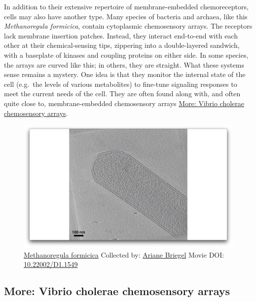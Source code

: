 \documentclass[]{tufte-book}
\begin{document}
In addition to their extensive repertoire of membrane-embedded
chemoreceptors, cells may also have another type. Many species of
bacteria and archaea, like this \emph{Methanoregula formicica}, contain
cytoplasmic chemosensory arrays. The receptors lack membrane insertion
patches. Instead, they interact end-to-end with each other at their
chemical-sensing tips, zippering into a double-layered sandwich, with a
baseplate of kinases and coupling proteins on either side. In some
species, the arrays are curved like this; in others, they are straight.
What these systems sense remains a mystery. One idea is that they
monitor the internal state of the cell (e.g.~the levels of various
metabolites) to fine-tune signaling responses to meet the current needs
of the cell. They are often found along with, and often quite close to,
membrane-embedded chemosensory arrays
\protect\hyperlink{Vibrio_cholerae_chemosensory_arrays}{More: Vibrio
cholerae chemosensory arrays}.





\begin{figure}
\includegraphics{movie_stills/7_5} \caption[\protect\hyperlink{tree}{Methanoregula formicica} Collected
by: \protect\hyperlink{ariane_briegel}{Ariane Briegel} Movie DOI:
\href{https://doi.org/10.22002/D1.1549}{10.22002/D1.1549}]{\protect\hyperlink{tree}{Methanoregula formicica} Collected
by: \protect\hyperlink{ariane_briegel}{Ariane Briegel} Movie DOI:
\href{https://doi.org/10.22002/D1.1549}{10.22002/D1.1549}}\label{fig:7-5}
\end{figure}

\hypertarget{Vibrio_cholerae_chemosensory_arrays}{\subsection*{More:
Vibrio cholerae chemosensory
arrays}\label{Vibrio_cholerae_chemosensory_arrays}}
\end{document}

